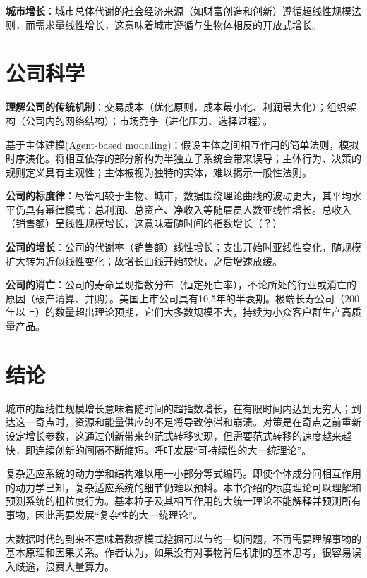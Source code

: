 \par \textbf{城市增长}：城市总体代谢的社会经济来源（如财富创造和创新）遵循超线性规模法则，而需求量线性增长，这意味着城市遵循与生物体相反的开放式增长。

\section{公司科学}

\par \textbf{理解公司的传统机制}：交易成本（优化原则，成本最小化、利润最大化）；组织架构（公司内的网络结构）；市场竞争（进化压力、选择过程）。

\par 基于主体建模(Agent-based modelling)：假设主体之间相互作用的简单法则，模拟时序演化。将相互依存的部分解构为半独立子系统会带来误导；主体行为、决策的规则定义具有主观性；主体被视为独特的实体，难以揭示一般性法则。

\par \textbf{公司的标度律}：尽管相较于生物、城市，数据围绕理论曲线的波动更大，其平均水平仍具有幂律模式：总利润、总资产、净收入等随雇员人数亚线性增长。总收入（销售额）呈线性规模增长，这意味着随时间的指数增长（？）

\par \textbf{公司的增长}：公司的代谢率（销售额）线性增长；支出开始时亚线性变化，随规模扩大转为近似线性变化；故增长曲线开始较快，之后增速放缓。

\par \textbf{公司的消亡}：公司的寿命呈现指数分布（恒定死亡率），不论所处的行业或消亡的原因（破产清算、并购）。美国上市公司具有10.5年的半衰期。极端长寿公司（200年以上）的数量超出理论预期，它们大多数规模不大，持续为小众客户群生产高质量产品。

\section{结论}

\par 城市的超线性规模增长意味着随时间的超指数增长，在有限时间内达到无穷大；到达这一奇点时，资源和能量供应的不足将导致停滞和崩溃。对策是在奇点之前重新设定增长参数，这通过创新带来的范式转移实现，但需要范式转移的速度越来越快，即连续创新的间隔不断缩短。呼吁发展“可持续性的大一统理论”。

\par 复杂适应系统的动力学和结构难以用一小部分等式编码。即使个体成分间相互作用的动力学已知，复杂适应系统的细节仍难以预料。本书介绍的标度理论可以理解和预测系统的粗粒度行为。基本粒子及其相互作用的大统一理论不能解释并预测所有事物，因此需要发展“复杂性的大一统理论”。

\par 大数据时代的到来不意味着数据模式挖掘可以节约一切问题，不再需要理解事物的基本原理和因果关系。作者认为，如果没有对事物背后机制的基本思考，很容易误入歧途，浪费大量算力。